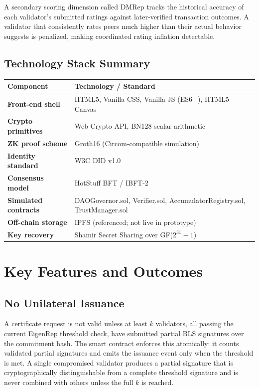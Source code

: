 \documentclass[12pt,a4paper]{article}
\begin{document}
A secondary scoring dimension called DMRep tracks the historical accuracy of each validator's submitted ratings against later-verified transaction outcomes. A validator that consistently rates peers much higher than their actual behavior suggests is penalized, making coordinated rating inflation detectable.

\subsection{Technology Stack Summary}

\begin{center}
\begin{tabular}{>{\bfseries}p{3.5cm} p{8cm}}
\toprule
Component & Technology / Standard \\
\midrule
Front-end shell & HTML5, Vanilla CSS, Vanilla JS (ES6+), HTML5 Canvas \\
Crypto primitives & Web Crypto API, BN128 scalar arithmetic \\
ZK proof scheme & Groth16 (Circom-compatible simulation) \\
Identity standard & W3C DID v1.0 \\
Consensus model & HotStuff BFT / IBFT-2 \\
Simulated contracts & DAOGovernor.sol, Verifier.sol, AccumulatorRegistry.sol, TrustManager.sol \\
Off-chain storage & IPFS (referenced; not live in prototype) \\
Key recovery & Shamir Secret Sharing over GF($2^{31}-1$) \\
\bottomrule
\end{tabular}
\end{center}

\section{Key Features and Outcomes}

\subsection{No Unilateral Issuance}
A certificate request is not valid unless at least $k$ validators, all passing the current EigenRep threshold check, have submitted partial BLS signatures over the commitment hash. The smart contract enforces this atomically: it counts validated partial signatures and emits the issuance event only when the threshold is met. A single compromised validator produces a partial signature that is cryptographically distinguishable from a complete threshold signature and is never combined with others unless the full $k$ is reached.
\end{document}

